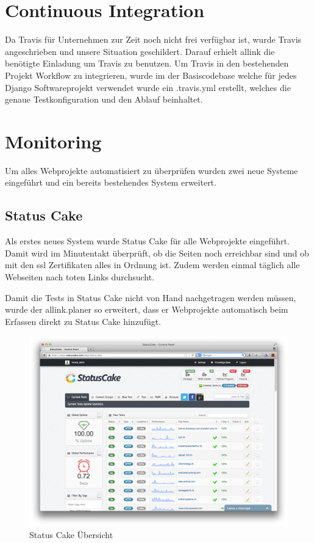 \section{Continuous Integration}
\label{sec:continuous_integration_proof_of_concept}
Da Travis für Unternehmen zur Zeit noch nicht frei verfügbar ist, wurde Travis angeschrieben und unsere Situation geschildert. Darauf erhielt allink die benötigte Einladung um Travis zu benutzen.
Um Travis in den bestehenden Projekt Workflow zu integrieren, wurde im der Basiscodebase welche für jedes Django Softwareprojekt verwendet wurde ein .travis.yml erstellt, welches die genaue Testkonfiguration und den Ablauf beinhaltet.

\section{Monitoring}
\label{sec:monitoring_proof_of_concept}
Um alles Webprojekte automatisiert zu überprüfen wurden zwei neue Systeme eingeführt und ein bereits bestehendes System erweitert.

\subsection{Status Cake}
\label{sub:status_cake}
Als erstes neues System wurde Status Cake für alle Webprojekte eingeführt. Damit wird im Minutentakt überprüft, ob die Seiten noch erreichbar sind und ob mit den \acrshort{ssl} Zertifikaten alles in Ordnung ist. Zudem werden einmal täglich alle Webseiten nach toten Links durchsucht.

Damit die Tests in Status Cake nicht von Hand nachgetragen werden müssen, wurde der allink.planer so erweitert, dass er Webprojekte automatisch beim Erfassen direkt zu Status Cake hinzufügt.

\begin{figure}[ht]
\centering
\includegraphics[width=1\textwidth]{images/status_cake.png}
\caption{Status Cake Übersicht}
\label{fig:status_cake}
\end{figure}


